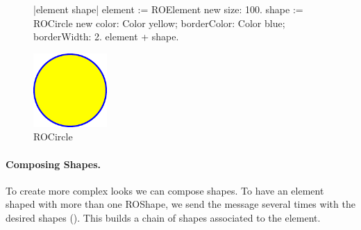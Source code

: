 \documentclass[a4paper,10pt,twoside]{book}
\begin{document}
\begin{figure}[H]
      \begin{minipage}[t]{0.5\textwidth}
      \vspace{0pt}
     \begin{code}
     
|element shape|
element := ROElement new 
				size: 100.
shape := ROCircle new 
			color: Color yellow; 
			borderColor: Color blue; 
			borderWidth: 2.
element + shape.	\end{code}
   \end{minipage}
   \hfill
   \begin{minipage}[t]{0.4\textwidth}
      \vspace{0pt} \raggedright
       \centering
		\includegraphics[width=0.25\textwidth]{circle}     
   \end{minipage}
\caption{ROCircle}
\label{fig:circle}
\end{figure}



\paragraph{Composing Shapes.}
To create more complex looks we can compose shapes. To have an element shaped with more than one ROShape, we send the \ct{+} message several times with the desired shapes (). This builds a chain of shapes associated to the element.
\end{document}
